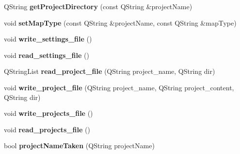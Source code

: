 \begin{DoxyCompactItemize}
\item 
Q\+String {\bfseries get\+Project\+Directory} (const Q\+String \&project\+Name)\hypertarget{class_app_settings_ae1547f13a85eb3d5609fe853e7f0b031}{}\label{class_app_settings_ae1547f13a85eb3d5609fe853e7f0b031}

\item 
void {\bfseries set\+Map\+Type} (const Q\+String \&project\+Name, const Q\+String \&map\+Type)\hypertarget{class_app_settings_ae9acb2ed62bf6e63ee792192e2e2c2f4}{}\label{class_app_settings_ae9acb2ed62bf6e63ee792192e2e2c2f4}

\item 
void {\bfseries write\+\_\+settings\+\_\+file} ()\hypertarget{class_app_settings_a044a33bf439c55642ab876fa3bffdc8b}{}\label{class_app_settings_a044a33bf439c55642ab876fa3bffdc8b}

\item 
void {\bfseries read\+\_\+settings\+\_\+file} ()\hypertarget{class_app_settings_a1b52026abce0b2f22dc8d48ade71dfe3}{}\label{class_app_settings_a1b52026abce0b2f22dc8d48ade71dfe3}

\item 
Q\+String\+List {\bfseries read\+\_\+project\+\_\+file} (Q\+String project\+\_\+name, Q\+String dir)\hypertarget{class_app_settings_a1e9c2d729c124dde43cc53100fa5a8a4}{}\label{class_app_settings_a1e9c2d729c124dde43cc53100fa5a8a4}

\item 
void {\bfseries write\+\_\+project\+\_\+file} (Q\+String project\+\_\+name, Q\+String project\+\_\+content, Q\+String dir)\hypertarget{class_app_settings_a3ff4a29a5a9f052f98bbac4b5f2962c8}{}\label{class_app_settings_a3ff4a29a5a9f052f98bbac4b5f2962c8}

\item 
void {\bfseries write\+\_\+projects\+\_\+file} ()\hypertarget{class_app_settings_a83837d6a6ab4896338b6178637820922}{}\label{class_app_settings_a83837d6a6ab4896338b6178637820922}

\item 
void {\bfseries read\+\_\+projects\+\_\+file} ()\hypertarget{class_app_settings_a20aac1922a43ccbbeeadc3e023bc0ed5}{}\label{class_app_settings_a20aac1922a43ccbbeeadc3e023bc0ed5}

\item 
bool {\bfseries project\+Name\+Taken} (Q\+String project\+Name)\hypertarget{class_app_settings_abc4f77e6834ff97fbf6209426659f03a}{}\label{class_app_settings_abc4f77e6834ff97fbf6209426659f03a}


\end{DoxyCompactItemize}
